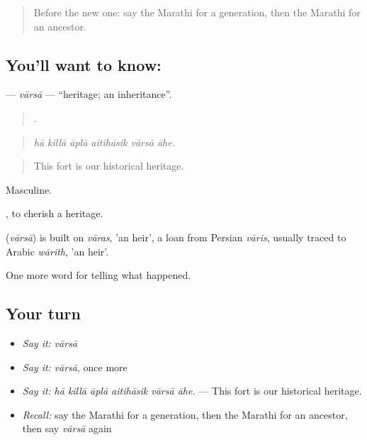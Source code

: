\label{lesson:MR-C308-varsa}



\begin{quote}
Before the new one: say the Marathi for a generation, then the Marathi for an ancestor.
\end{quote}

\subsection*{You'll want to know: }
\textbf{} — \emph{vārsā} — \textquotedblleft{}heritage; an inheritance\textquotedblright{}.

\begin{quote}
     .
\end{quote}

\begin{quote}
\emph{hā killā āplā aitihāsik vārsā āhe.}
\end{quote}

\begin{quote}
This fort is our historical heritage.
\end{quote}

Masculine.

 , to cherish a heritage.

\begin{cousinweb}
\textbf{} (\emph{vārsā}) is built on \emph{vāras}, 'an heir', a loan from Persian \emph{vāris}, usually traced to Arabic \emph{wārith}, 'an heir'.
\end{cousinweb}

\begin{grammarlens}[title={What you've built}]
One more word for telling what happened.
\end{grammarlens}

\subsection*{Your turn}
\begin{itemize}
\raggedright
  \item \emph{Say it:} \emph{vārsā}
  \item \emph{Say it:} \emph{vārsā}, once more
  \item \emph{Say it:} \emph{hā killā āplā aitihāsik vārsā āhe.} — This fort is our historical heritage.
  \item \emph{Recall:} say the Marathi for a generation, then the Marathi for an ancestor, then say \emph{vārsā} again
\end{itemize}

